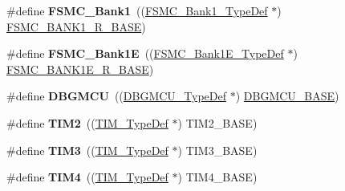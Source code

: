 \begin{DoxyCompactItemize}
\item 
\hypertarget{group___peripheral__declaration_ga2a759bad07fe730c99f9e1490e646220}{\#define {\bfseries F\-S\-M\-C\-\_\-\-Bank1}~((\hyperlink{struct_f_s_m_c___bank1___type_def}{F\-S\-M\-C\-\_\-\-Bank1\-\_\-\-Type\-Def} $\ast$) \hyperlink{group___peripheral__memory__map_ga48d8f80d608b64cb42e7ed223066f856}{F\-S\-M\-C\-\_\-\-B\-A\-N\-K1\-\_\-\-R\-\_\-\-B\-A\-S\-E})}\label{group___peripheral__declaration_ga2a759bad07fe730c99f9e1490e646220}

\item 
\hypertarget{group___peripheral__declaration_ga422986101f42a8811ae89ac69deb2759}{\#define {\bfseries F\-S\-M\-C\-\_\-\-Bank1\-E}~((\hyperlink{struct_f_s_m_c___bank1_e___type_def}{F\-S\-M\-C\-\_\-\-Bank1\-E\-\_\-\-Type\-Def} $\ast$) \hyperlink{group___peripheral__memory__map_gaa2ebab683a214fe3b0c628228bff3724}{F\-S\-M\-C\-\_\-\-B\-A\-N\-K1\-E\-\_\-\-R\-\_\-\-B\-A\-S\-E})}\label{group___peripheral__declaration_ga422986101f42a8811ae89ac69deb2759}

\item 
\hypertarget{group___peripheral__declaration_ga92ec6d9ec2251fda7d4ce09748cd74b4}{\#define {\bfseries D\-B\-G\-M\-C\-U}~((\hyperlink{struct_d_b_g_m_c_u___type_def}{D\-B\-G\-M\-C\-U\-\_\-\-Type\-Def} $\ast$) \hyperlink{group___peripheral__memory__map_ga4adaf4fd82ccc3a538f1f27a70cdbbef}{D\-B\-G\-M\-C\-U\-\_\-\-B\-A\-S\-E})}\label{group___peripheral__declaration_ga92ec6d9ec2251fda7d4ce09748cd74b4}

\item 
\hypertarget{group___peripheral__declaration_ga3cfac9f2e43673f790f8668d48b4b92b}{\#define {\bfseries T\-I\-M2}~((\hyperlink{struct_t_i_m___type_def}{T\-I\-M\-\_\-\-Type\-Def} $\ast$) T\-I\-M2\-\_\-\-B\-A\-S\-E)}\label{group___peripheral__declaration_ga3cfac9f2e43673f790f8668d48b4b92b}

\item 
\hypertarget{group___peripheral__declaration_ga61ee4c391385607d7af432b63905fcc9}{\#define {\bfseries T\-I\-M3}~((\hyperlink{struct_t_i_m___type_def}{T\-I\-M\-\_\-\-Type\-Def} $\ast$) T\-I\-M3\-\_\-\-B\-A\-S\-E)}\label{group___peripheral__declaration_ga61ee4c391385607d7af432b63905fcc9}

\item 
\hypertarget{group___peripheral__declaration_ga91a09bad8bdc7a1cb3d85cf49c94c8ec}{\#define {\bfseries T\-I\-M4}~((\hyperlink{struct_t_i_m___type_def}{T\-I\-M\-\_\-\-Type\-Def} $\ast$) T\-I\-M4\-\_\-\-B\-A\-S\-E)}\label{group___peripheral__declaration_ga91a09bad8bdc7a1cb3d85cf49c94c8ec}


\end{DoxyCompactItemize}
